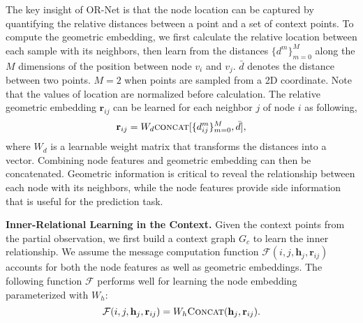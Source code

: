 \documentclass[sigconf]{acmart} %
\begin{document}
The key insight of OR-Net is that the node location can be captured by quantifying the relative distances between a point and a set of context points. 
To compute the geometric embedding, we first calculate the relative location between each sample with its neighbors, then learn from the distances $\{d^m\}_{m=0}^M$ along the $M$ dimensions of the position between node $v_i$ and $v_j$. $\bar{d}$ denotes the distance between two points. $M=2$ when points are sampled from a 2D coordinate.
Note that the values of location are normalized before calculation. The relative geometric embedding $\mathbf{r}_{ij}$ can be learned for each neighbor $j$ of node $i$ as following,
\begin{equation}\label{eq:pos_emb}
    \mathbf{r}_{ij} = W_d \textsc{concat}[\{d^m_{ij}\}_{m=0}^M, \bar{d}],
\end{equation}
where $W_d$ is a learnable weight matrix that transforms the distances into a vector. Combining node features and geometric embedding can then be concatenated.
Geometric information is critical to reveal the relationship between each node with its neighbors, while the node features provide side information that is useful for the prediction task.


\noindent\textbf{Inner-Relational Learning in the Context.} 
Given the context points from the partial observation, we first build a context graph $G_c$ to learn the inner relationship. We assume the message computation function $\mathcal{F}(i,j,\mathbf{h}_j, \mathbf{r}_{ij})$ accounts for both the node features as well as geometric embeddings. The following function $\mathcal{F}$ performs well for learning the node embedding parameterized with $W_h$:
\begin{equation}\label{eq:message}
   \mathcal{F}(i,j,\mathbf{h}_j, \mathbf{r}_{ij}) = W_h\textsc{Concat}(\mathbf{h}_j,\mathbf{r}_{ij}).
\end{equation}
\end{document}
